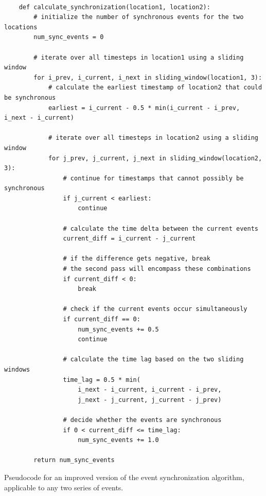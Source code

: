 \begin{listing}[H]
  \begin{verbatim}

    def calculate_synchronization(location1, location2):
        # initialize the number of synchronous events for the two locations
        num_sync_events = 0

        # iterate over all timesteps in location1 using a sliding window
        for i_prev, i_current, i_next in sliding_window(location1, 3):
            # calculate the earliest timestamp of location2 that could be synchronous
            earliest = i_current - 0.5 * min(i_current - i_prev, i_next - i_current)

            # iterate over all timesteps in location2 using a sliding window
            for j_prev, j_current, j_next in sliding_window(location2, 3):
                # continue for timestamps that cannot possibly be synchronous
                if j_current < earliest:
                    continue

                # calculate the time delta between the current events
                current_diff = i_current - j_current

                # if the difference gets negative, break
                # the second pass will encompass these combinations
                if current_diff < 0:
                    break

                # check if the current events occur simultaneously
                if current_diff == 0:
                    num_sync_events += 0.5
                    continue

                # calculate the time lag based on the two sliding windows
                time_lag = 0.5 * min(
                    i_next - i_current, i_current - i_prev,
                    j_next - j_current, j_current - j_prev)

                # decide whether the events are synchronous
                if 0 < current_diff <= time_lag:
                    num_sync_events += 1.0

        return num_sync_events

  \end{verbatim}
  \caption{Pseudocode for an improved version of the event synchronization algorithm, applicable to any two series of events.}
  \label{lst:event_synchronization_improved}
\end{listing}

